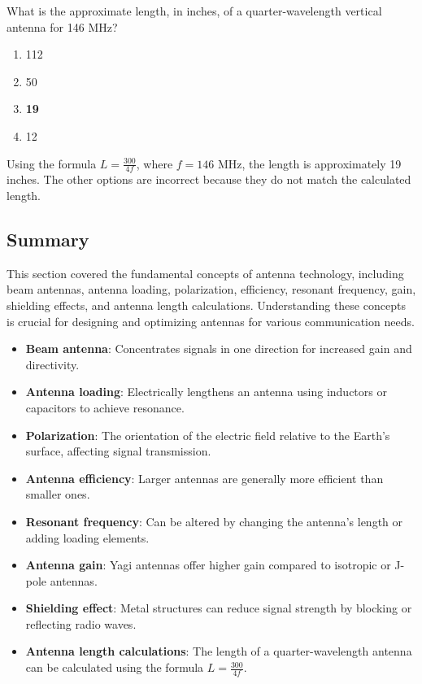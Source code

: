 
\begin{tcolorbox}[colback=gray!10!white,colframe=black!75!black,title={T9A08}]
    What is the approximate length, in inches, of a quarter-wavelength vertical antenna for 146 MHz?
    \begin{enumerate}[label=\Alph*,noitemsep]
        \item 112
        \item 50
        \item \textbf{19}
        \item 12
    \end{enumerate}
\end{tcolorbox}
Using the formula \( L = \frac{300}{4f} \), where \( f = 146 \) MHz, the length is approximately 19 inches. The other options are incorrect because they do not match the calculated length.


\subsection*{Summary}
This section covered the fundamental concepts of antenna technology, including beam antennas, antenna loading, polarization, efficiency, resonant frequency, gain, shielding effects, and antenna length calculations. Understanding these concepts is crucial for designing and optimizing antennas for various communication needs.

\begin{itemize}
    \item \textbf{Beam antenna}: Concentrates signals in one direction for increased gain and directivity.
    \item \textbf{Antenna loading}: Electrically lengthens an antenna using inductors or capacitors to achieve resonance.
    \item \textbf{Polarization}: The orientation of the electric field relative to the Earth's surface, affecting signal transmission.
    \item \textbf{Antenna efficiency}: Larger antennas are generally more efficient than smaller ones.
    \item \textbf{Resonant frequency}: Can be altered by changing the antenna's length or adding loading elements.
    \item \textbf{Antenna gain}: Yagi antennas offer higher gain compared to isotropic or J-pole antennas.
    \item \textbf{Shielding effect}: Metal structures can reduce signal strength by blocking or reflecting radio waves.
    \item \textbf{Antenna length calculations}: The length of a quarter-wavelength antenna can be calculated using the formula \( L = \frac{300}{4f} \).
\end{itemize}
